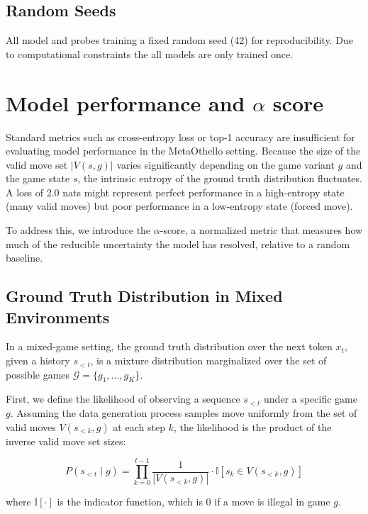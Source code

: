 \documentclass{article}
\theoremstyle{plain}
\theoremstyle{definition}
\theoremstyle{remark}
\begin{document}
\subsection{Random Seeds}
\label{app:seeds}

All model and probes training a fixed random seed (42) for reproducibility. Due to computational constraints the all models are only trained once.


\section{Model performance and $\alpha$ score}
\label{alpha-app}

Standard metrics such as cross-entropy loss or top-1 accuracy are insufficient for evaluating model performance in the MetaOthello setting. Because the size of the valid move set $|V(s, g)|$ varies significantly depending on the game variant $g$ and the game state $s$, the intrinsic entropy of the ground truth distribution fluctuates. A loss of 2.0 nats might represent perfect performance in a high-entropy state (many valid moves) but poor performance in a low-entropy state (forced move).

To address this, we introduce the $\alpha$-score, a normalized metric that measures how much of the reducible uncertainty the model has resolved, relative to a random baseline.

\subsection{Ground Truth Distribution in Mixed Environments}

In a mixed-game setting, the ground truth distribution over the next token $x_{t}$, given a history $s_{<t}$, is a mixture distribution marginalized over the set of possible games $\mathcal{G} = \{g_1, \dots, g_K\}$.

First, we define the likelihood of observing a sequence $s_{<t}$ under a specific game $g$. Assuming the data generation process samples move uniformly from the set of valid moves $V(s_{<k}, g)$ at each step $k$, the likelihood is the product of the inverse valid move set sizes:

\begin{equation}
    P(s_{<t} \mid g) = \prod_{k=0}^{t-1} \frac{1}{|V(s_{<k}, g)|} \cdot \mathbb{I}[s_k \in V(s_{<k}, g)]
\end{equation}

where $\mathbb{I}[\cdot]$ is the indicator function, which is $0$ if a move is illegal in game $g$.
\end{document}
